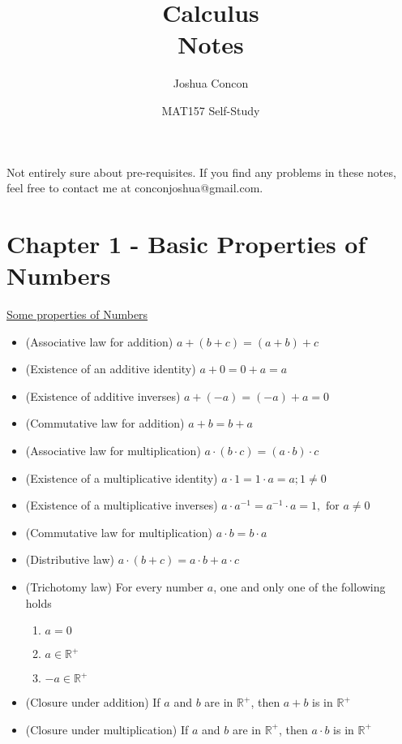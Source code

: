 \documentclass[12pt]{article}
\begin{document}
\title{Calculus\\ Notes}
\date{MAT157 Self-Study}
\author{Joshua Concon}
\maketitle
Not entirely sure about pre-requisites. If you find any problems in these notes, feel free to contact me at conconjoshua@gmail.com.

\tableofcontents

\pagebreak

\section{Chapter 1 - Basic Properties of Numbers}

\underline{Some properties of Numbers}
\begin{itemize}
	\item{(Associative law for addition) $a + (b + c) = (a + b) + c$}
	\item{(Existence of an additive identity) $a + 0 = 0 + a = a$}
	\item{(Existence of additive inverses) $a + (-a) = (-a) + a = 0$}
	\item{(Commutative law for addition) $a + b = b + a$}
	\item{(Associative law for multiplication) $a\cdot(b\cdot c) = (a\cdot b)\cdot c$}
	\item{(Existence of a multiplicative identity) $a\cdot 1 = 1\cdot a = a; 1\neq 0$}
	\item{(Existence of a multiplicative inverses) $a \cdot a^{-1} = a^{-1} \cdot a = 1, \text{ for } a\neq 0$}
	\item{(Commutative law for multiplication) $a \cdot b = b \cdot a$}
	\item{(Distributive law) $a\cdot(b+c) = a\cdot b + a \cdot c$}
	\item{(Trichotomy law) For every number $a$, one and only one of the following holds}
	\begin{enumerate}
		\item{$a = 0$}
		\item{$a \in\mathbb{R}^{+}$}
		\item{$-a \in\mathbb{R}^{+}$}
	\end{enumerate}
	\item{(Closure under addition) If $a$ and $b$ are in $\mathbb{R}^{+}$, then $a+b$ is in $\mathbb{R}^{+}$}
	\item{(Closure under multiplication) If $a$ and $b$ are in $\mathbb{R}^{+}$, then $a\cdot b$ is in $\mathbb{R}^{+}$}
\end{itemize}
\end{document}
